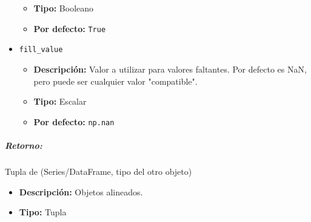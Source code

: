 \begin{itemize}
\begin{itemize}
\item \textbf{Tipo:} Booleano
\item \textbf{Por defecto:} \texttt{True}
\end{itemize}
\item \texttt{fill\_value}
\begin{itemize}
\item \textbf{Descripción:} Valor a utilizar para valores faltantes. Por defecto es NaN, pero puede ser cualquier valor "compatible".
\item \textbf{Tipo:} Escalar
\item \textbf{Por defecto:} \texttt{np.nan}
\end{itemize}
\end{itemize}
\subparagraph{Retorno:} Tupla de (Series/DataFrame, tipo del otro objeto)
\begin{itemize}
\item \textbf{Descripción:} Objetos alineados.
\item \textbf{Tipo:} Tupla
\end{itemize}
